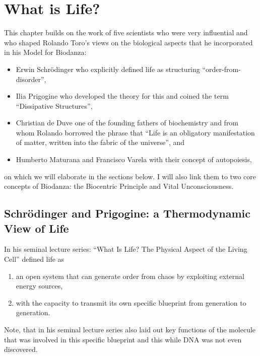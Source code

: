 \documentclass[
  11pt,
]{book}
\providecommand{\tightlist}{%
  \setlength{\itemsep}{0pt}\setlength{\parskip}{0pt}}
\begin{document}
\hypertarget{what-is-life}{%
\chapter{What is Life?}\label{what-is-life}}

This chapter builds on the work of five scientists who were very influential and who shaped Rolando Toro's views on the biological aspects that he incorporated in his Model for Biodanza:

\begin{itemize}
\tightlist
\item
  Erwin Schrödinger who explicitly defined life as structuring ``order-from-disorder'',
\item
  Ilia Prigogine who developed the theory for this and coined the term ``Dissipative Structures'',
\item
  Christian de Duve one of the founding fathers of biochemistry and from whom Rolando borrowed the phrase that ``Life is an obligatory manifestation of matter, written into the fabric of the universe'', and
\item
  Humberto Maturana and Francisco Varela with their concept of autopoiesis,
\end{itemize}

on which we will elaborate in the sections below. I will also link them to two core concepts of Biodanza: the Biocentric Principle and Vital Unconsciousness.

\hypertarget{schruxf6dinger-and-prigogine-a-thermodynamic-view-of-life}{%
\section{Schrödinger and Prigogine: a Thermodynamic View of Life}\label{schruxf6dinger-and-prigogine-a-thermodynamic-view-of-life}}

In his seminal lecture series: ``What Is Life? The Physical Aspect of the Living Cell'' \citet{schrodinger1944} defined life as

\begin{enumerate}
\def\labelenumi{\arabic{enumi}.}
\item
  an open system that can generate order from chaos by exploiting external energy sources,
\item
  with the capacity to transmit its own specific blueprint from generation to generation.
\end{enumerate}

Note, that in his seminal lecture series \citet{schrodinger1944} also laid out key functions of the molecule that was involved in this specific blueprint and this while DNA was not even discovered.
\end{document}

